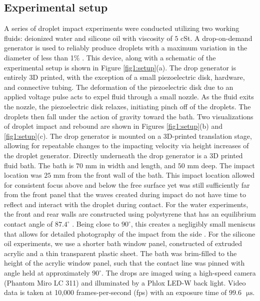 \documentclass{jfm}
\begin{document}
\subsection{Experimental setup}
A series of droplet impact experiments were conducted utilizing two working fluids: deionized water and silicone oil with viscosity of $5$ cSt. A drop-on-demand generator is used to reliably produce droplets with a maximum variation in the diameter of less than 1$\%$ \citep{ionkin2018note}. This device, along with a schematic of the experimental setup is shown in Figure \ref{fig1:setup}(a). The drop generator is entirely 3D printed, with the exception of a small piezoelectric disk, hardware, and connective tubing. 
The deformation of the piezoelectric disk due to an applied voltage pulse acts to expel fluid through a small nozzle. As the fluid exits the nozzle, the piezoelectric disk relaxes, initiating pinch off of the droplets. The droplets then fall under the action of gravity toward the bath. Two visualizations of droplet impact and rebound are shown in Figures \ref{fig1:setup}(b) and \ref{fig1:setup}(c). The drop generator is mounted on a 3D-printed translation stage, allowing for repeatable changes to the impacting velocity via height increases of the droplet generator. Directly underneath the drop generator is a 3D printed fluid bath. The bath is $70$ mm in width and length, and $50$ mm deep. The impact location was $25$ mm from the front wall of the bath. This impact location allowed for consistent focus above and below the free surface yet was still sufficiently far from the front panel that the waves created during impact do not have time to reflect and interact with the droplet during contact.  For the water experiments, the front and rear walls are constructed using polystyrene that has an equilibrium contact angle of $87.4^{\circ}$ \citep{ellison1954wettability}. Being close to $90^{\circ}$, this creates a negligibly small meniscus that allows for detailed photography of the impact from the side \citep{galeano2021capillary}. For the silicone oil experiments, we use a shorter bath window panel, constructed of extruded acrylic and a thin transparent plastic sheet. The bath was brim-filled to the height of the acrylic window panel, such that the contact line was pinned with angle held at approximately $90^{\circ}$. The drops are imaged using a high-speed camera (Phantom Miro LC 311) and illuminated by a Phlox LED-W back light. Video data is taken at 10,000 frames-per-second (fps) with an exposure time of $99.6 \text{ } \mathrm{ \mu s}$. \\
\end{document}
